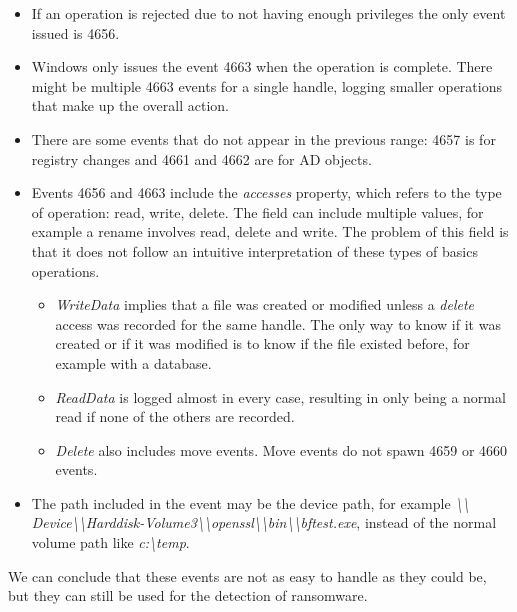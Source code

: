\begin{itemize}
	\item If an operation is rejected due to not having enough privileges the only event issued is 4656.
	\item Windows only issues the event 4663 when the operation is complete. There might be multiple 4663 events for a single handle, logging smaller operations that make up the overall action.
	\item There are some events that do not appear in the previous range: 4657 is for registry changes and 4661 and 4662 are for AD objects.
	\item Events 4656 and 4663 include the \textit{accesses} property, which refers to the type of operation: read, write, delete.
		The field can include multiple values, for example a rename involves read, delete and write.
		The problem of this field is that it does not follow an intuitive interpretation of these types of basics operations.
	\begin{itemize}
		\item \textit{WriteData} implies that a file was created or modified unless a \textit{delete} access was recorded for the same handle. The only way to know if it was created or if it was modified is to know if the file existed before, for example with a database.
		\item \textit{ReadData} is logged almost in every case, resulting in only being a normal read if none of the others are recorded.
		\item \textit{Delete} also includes move events. Move events do not spawn 4659 or 4660 events.
	\end{itemize}
\item The path included in the event may be the device path, for example \textit{{\textbackslash}{\textbackslash} Device{\textbackslash}{\textbackslash}Harddisk-Volume3{\textbackslash}{\textbackslash}openssl{\textbackslash}{\textbackslash}bin{\textbackslash}{\textbackslash}bftest.exe}, instead of the normal volume path like \textit{c:{\textbackslash}temp}.
\end{itemize}
\linej
We can conclude that these events are not as easy to handle as they could be, but they can still be used for the detection of ransomware.


